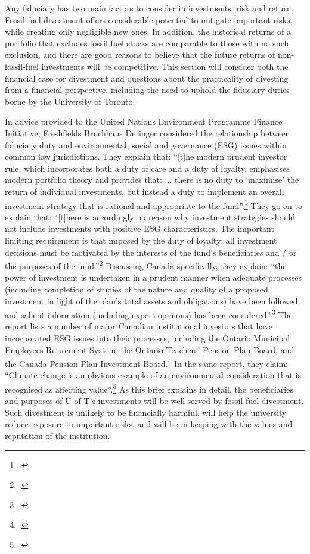 \documentclass[10pt]{article}
\begin{document}
Any fiduciary has two main factors to consider in investments: risk and return.
Fossil fuel divestment offers considerable potential to mitigate important risks, while creating only negligible new ones.
In addition, the historical returns of a portfolio that excludes fossil fuel stocks are comparable to those with no such exclusion, and there are good reasons to believe that the future returns of non-fossil-fuel investments will be competitive.
This section will consider both the financial case for divestment and questions about the practicality of divesting from a financial perspective, including the need to uphold the fiduciary duties borne by the University of Toronto.



In advice provided to the United Nations Environment Programme Finance Initiative, Freshfields Bruchhaus Deringer considered the relationship between fiduciary duty and environmental, social and governance (ESG) issues within common law jurisdictions.
They explain that: ``[t]he modern prudent investor rule, which incorporates both a duty of care and a duty of loyalty, emphasises modern portfolio theory and provides that: ... there is no duty to `maximise' the return of individual investments, but instead a duty to implement an overall investment strategy that is rational and appropriate to the fund''.\footcite[][p. 6]{UNEPFinanceInit}
They go on to explain that: ``[t]here is accordingly no reason why investment strategies should not include investments with positive ESG characteristics. The important limiting requirement is that imposed by the duty of loyalty: all investment decisions must be motivated by the interests of the fund's beneficiaries and / or the purposes of the fund.''\footcite[][p. 6]{UNEPFinanceInit}
Discussing Canada specifically, they explain: ``the power of investment is undertaken in a prudent manner when adequate processes (including completion of studies of the nature and quality of a proposed investment in light of the plan's total assets and obligations) have been followed and salient information (including expert opinions) has been considered''.\footcite[][p. 51]{UNEPFinanceInit}
The report lists a number of major Canadian institutional investors that have incorporated ESG issues into their processes, including the Ontario Municipal Employees Retirement System, the Ontario Teachers' Pension Plan Board, and the Canada Pension Plan Investment Board.\footcite[][p. 52]{UNEPFinanceInit}
In the same report, they claim: ``Climate change is an obvious example of an environmental consideration that is recognised as affecting value''.\footcite[][p. 11]{UNEPFinanceInit}
As this brief explains in detail, the beneficiaries and purposes of U of T's investments will be well-served by fossil fuel divestment.
Such divestment is unlikely to be financially harmful, will help the university reduce exposure to important risks, and will be in keeping with the values and reputation of the institution.
\end{document}
